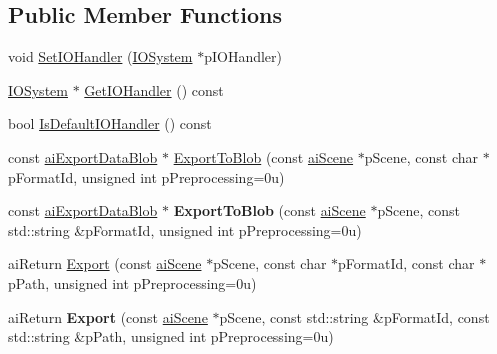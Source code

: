 \subsection*{Public Member Functions}
\begin{DoxyCompactItemize}
\item 
void \hyperlink{class_assimp_1_1_exporter_a00659853ddada71b821edae8e890f169}{Set\+I\+O\+Handler} (\hyperlink{class_assimp_1_1_i_o_system}{I\+O\+System} $\ast$p\+I\+O\+Handler)
\item 
\hyperlink{class_assimp_1_1_i_o_system}{I\+O\+System} $\ast$ \hyperlink{class_assimp_1_1_exporter_abcfea186b4e7edf5eca7b1000f2ab9e7}{Get\+I\+O\+Handler} () const 
\item 
bool \hyperlink{class_assimp_1_1_exporter_a57ed55c149f56cb47c8fcd1dc6f1910a}{Is\+Default\+I\+O\+Handler} () const 
\item 
const \hyperlink{structai_export_data_blob}{ai\+Export\+Data\+Blob} $\ast$ \hyperlink{class_assimp_1_1_exporter_a534989e16682cc20fde977f9f859aa29}{Export\+To\+Blob} (const \hyperlink{structai_scene}{ai\+Scene} $\ast$p\+Scene, const char $\ast$p\+Format\+Id, unsigned int p\+Preprocessing=0u)
\item 
\hypertarget{class_assimp_1_1_exporter_a02aa8c453879dc9365e7ec4d1e8d7413}{const \hyperlink{structai_export_data_blob}{ai\+Export\+Data\+Blob} $\ast$ {\bfseries Export\+To\+Blob} (const \hyperlink{structai_scene}{ai\+Scene} $\ast$p\+Scene, const std\+::string \&p\+Format\+Id, unsigned int p\+Preprocessing=0u)}\label{class_assimp_1_1_exporter_a02aa8c453879dc9365e7ec4d1e8d7413}

\item 
ai\+Return \hyperlink{class_assimp_1_1_exporter_a3226ea1a598a94c899fa17acebe5d47d}{Export} (const \hyperlink{structai_scene}{ai\+Scene} $\ast$p\+Scene, const char $\ast$p\+Format\+Id, const char $\ast$p\+Path, unsigned int p\+Preprocessing=0u)
\item 
\hypertarget{class_assimp_1_1_exporter_aec681d38ca0bef85a015c64831a3566a}{ai\+Return {\bfseries Export} (const \hyperlink{structai_scene}{ai\+Scene} $\ast$p\+Scene, const std\+::string \&p\+Format\+Id, const std\+::string \&p\+Path, unsigned int p\+Preprocessing=0u)}\label{class_assimp_1_1_exporter_aec681d38ca0bef85a015c64831a3566a}


\end{DoxyCompactItemize}
